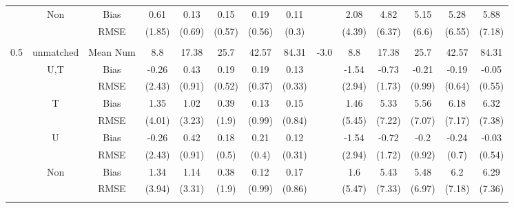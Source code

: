 \begin{tabular}{@{\extracolsep{5pt}}lc|cccccc|lccccc}
 & Non & Bias & 0.61 & 0.13 & 0.15 & 0.19 & 0.11 &  & 2.08 & 4.82 & 5.15 & 5.28 & 5.88 \\
 &  & RMSE & (1.85) & (0.69) & (0.57) & (0.56) & (0.3) &  & (4.39) & (6.37) & (6.6) & (6.55) & (7.18) \\
 &  &  &  &  &  &  &  &  &  &  &  &  &  \\
0.5 & unmatched & Mean Num & 8.8 & 17.38 & 25.7 & 42.57 & 84.31 & -3.0 & 8.8 & 17.38 & 25.7 & 42.57 & 84.31 \\
 & U,T & Bias & -0.26 & 0.43 & 0.19 & 0.19 & 0.13 &  & -1.54 & -0.73 & -0.21 & -0.19 & -0.05 \\
 &  & RMSE & (2.43) & (0.91) & (0.52) & (0.37) & (0.33) &  & (2.94) & (1.73) & (0.99) & (0.64) & (0.55) \\
 & T & Bias & 1.35 & 1.02 & 0.39 & 0.13 & 0.15 &  & 1.46 & 5.33 & 5.56 & 6.18 & 6.32 \\
 &  & RMSE & (4.01) & (3.23) & (1.9) & (0.99) & (0.84) &  & (5.45) & (7.22) & (7.07) & (7.17) & (7.38) \\
 & U & Bias & -0.26 & 0.42 & 0.18 & 0.21 & 0.12 &  & -1.54 & -0.72 & -0.2 & -0.24 & -0.03 \\
 &  & RMSE & (2.43) & (0.91) & (0.5) & (0.4) & (0.31) &  & (2.94) & (1.72) & (0.92) & (0.7) & (0.54) \\
 & Non & Bias & 1.34 & 1.14 & 0.38 & 0.12 & 0.17 &  & 1.6 & 5.43 & 5.48 & 6.2 & 6.29 \\
 &  & RMSE & (3.94) & (3.31) & (1.9) & (0.99) & (0.86) &  & (5.47) & (7.33) & (6.97) & (7.18) & (7.36) \\
 &  &  &  &  &  &  &  &  &  &  &  &  &  \\
\hline 
\bottomrule 
\end{tabular}
